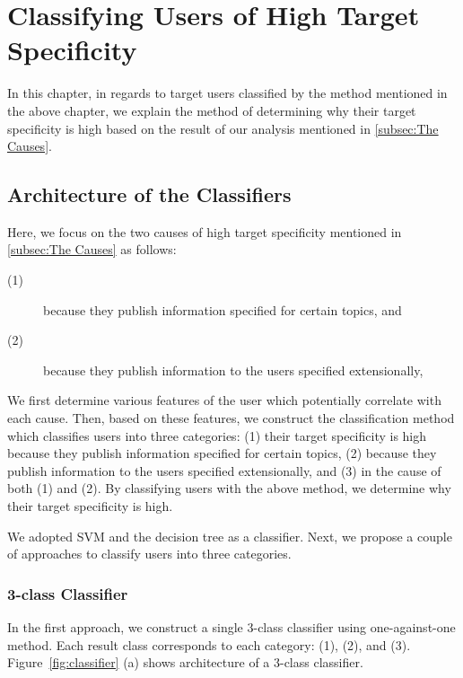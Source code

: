 \section{Classifying Users of High Target Specificity}
\label{sec:ClassificationMethod2}

In this chapter, in regards to target users classified by the method
mentioned in the above chapter, we explain the method of determining why
their target specificity is high based on the result of our analysis
mentioned in \ref{subsec:The Causes}.

\subsection{Architecture of the Classifiers}
\label{subsec:Architecture}

Here, we focus on the two causes of high target specificity
mentioned in \ref{subsec:The Causes} as follows:
\begin{description}
 \item[(1)] because they publish information specified for certain
            topics, and
 \item[(2)] because they publish information to the users specified
            extensionally,
\end{description}


We first determine various features of the user which potentially
correlate with each cause.  Then, based on these features, we construct
the classification method which classifies users into three categories:
(1) their target specificity is high because they publish information
specified for certain topics, (2) because they publish information to
the users specified extensionally, and (3) in the cause of both (1) and
(2).  By classifying users with the above method, we determine why
their target specificity is high.

We adopted SVM and the decision tree as a classifier.  Next, we propose a
couple of approaches to classify users into three categories.

\subsubsection{3-class Classifier}
\label{subsubsec:3-class}

In the first approach, we construct a single 3-class classifier using
one-against-one method.  Each result class corresponds to each category:
(1), (2), and (3).  Figure~\ref{fig:classifier} (a) shows architecture
of a 3-class classifier.

